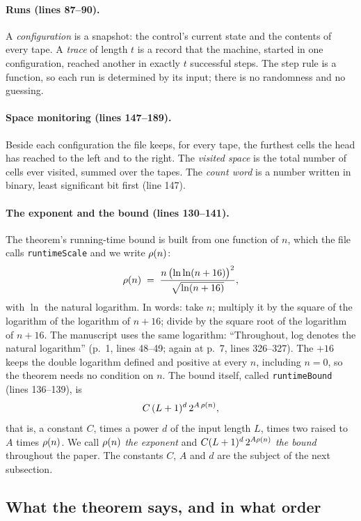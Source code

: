 \paragraph{Runs (lines 87--90).}
A \emph{configuration} is a snapshot: the control's current state and the contents of every tape. A \emph{trace} of length $t$ is a record that the machine, started in one configuration, reached another in exactly $t$ successful steps. The
step rule is a function, so each run is determined by its input; there
is no randomness and no guessing.

\paragraph{Space monitoring (lines 147--189).}
Beside each configuration the file keeps, for every tape, the furthest
cells the head has reached to the left and to the right. The
\emph{visited space} is the total number of cells ever visited, summed
over the tapes. The \emph{count word} is a number written in binary,
least significant bit first (line 147).

\paragraph{The exponent and the bound (lines 130--141).}
The theorem's running-time bound is built from one function of $n$,
which the file calls \texttt{runtimeScale} and we write $\rho(n)$:
\[
  \rho(n) \;=\; \frac{n\,\bigl(\ln\ln(n+16)\bigr)^2}{\sqrt{\ln(n+16)}},
\]
with $\ln$ the natural logarithm. In words: take $n$; multiply it by
the square of the logarithm of the logarithm of $n + 16$; divide by the
square root of the logarithm of $n + 16$. The manuscript uses the same
logarithm: ``Throughout, log denotes the natural logarithm'' (p.~1,
lines 48--49; again at p.~7, lines 326--327). The $+16$ keeps the double
logarithm defined and positive at every $n$, including $n = 0$, so the
theorem needs no condition on $n$. The bound itself, called
\texttt{runtimeBound} (lines 136--139), is
\[
  C\,(L+1)^d\,2^{A\,\rho(n)},
\]
that is, a constant $C$, times a power $d$ of the input length $L$,
times two raised to $A$ times $\rho(n)$. We call $\rho(n)$ \emph{the
exponent} and $C(L+1)^d\,2^{A\rho(n)}$ \emph{the bound} throughout the
paper. The constants $C$, $A$ and $d$ are the subject of the next
subsection.

\subsection{What the theorem says, and in what order}
\label{sec:statement-theorem}

